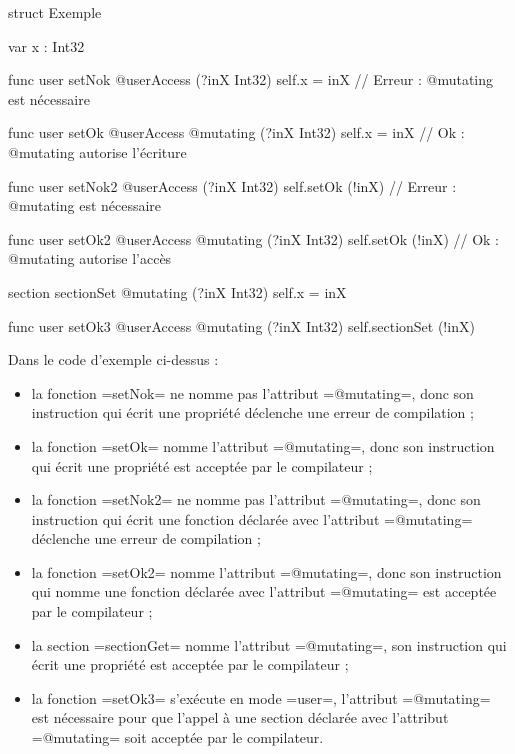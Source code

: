 \begin{PLM}
struct Exemple {
  var x : Int32
  
  func user setNok @userAccess (?inX Int32) {
    self.x = inX // Erreur : @mutating est nécessaire
  }
  
  func user setOk @userAccess @mutating (?inX Int32) {
    self.x = inX // Ok : @mutating autorise l'écriture
  }
  
  func user setNok2 @userAccess (?inX Int32) {
    self.setOk (!inX) // Erreur : @mutating est nécessaire
  }
  
  func user setOk2 @userAccess @mutating (?inX Int32) {
    self.setOk (!inX) // Ok : @mutating autorise l'accès
  }
  
  section sectionSet @mutating (?inX Int32) {
    self.x = inX
  }

  func user setOk3 @userAccess @mutating (?inX Int32) {
    self.sectionSet (!inX)
  }

}
\end{PLM}

Dans le code d'exemple ci-dessus :
\begin{itemize}
  \item la fonction \plm=setNok= ne nomme pas l'attribut \plm=@mutating=, donc son instruction qui écrit une propriété déclenche une erreur de compilation ;
  \item la fonction \plm=setOk= nomme l'attribut \plm=@mutating=, donc son instruction qui écrit une propriété est acceptée par le compilateur ;
  \item la fonction \plm=setNok2= ne nomme pas l'attribut \plm=@mutating=, donc son instruction qui écrit une fonction déclarée avec l'attribut \plm=@mutating= déclenche une erreur de compilation ;
  \item la fonction \plm=setOk2= nomme l'attribut \plm=@mutating=, donc son instruction qui nomme une fonction déclarée avec l'attribut \plm=@mutating= est acceptée par le compilateur ;
  \item la section \plm=sectionGet= nomme l'attribut \plm=@mutating=, son instruction qui écrit une propriété est acceptée par le compilateur ;
  \item la fonction \plm=setOk3= s'exécute en mode \plm=user=, l'attribut \plm=@mutating= est nécessaire pour que l'appel à une section déclarée avec l'attribut \plm=@mutating= soit acceptée par le compilateur.
\end{itemize}












